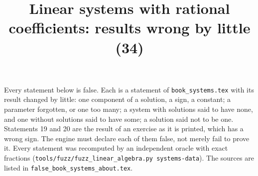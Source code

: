 \documentclass[11pt,a4paper]{article}
\title{Linear systems with rational coefficients: results wrong by little (34)}
\author{}
\date{}
\begin{document}
\maketitle
Every statement below is false. Each is a statement of \texttt{book\_systems.tex} with its result changed by little: one component of a solution, a sign, a constant; a parameter forgotten, or one too many; a system with solutions said to have none, and one without solutions said to have some; a solution said not to be one. Statements 19 and 20 are the result of an exercise as it is printed, which has a wrong sign. The engine must declare each of them false, not merely fail to prove it. Every statement was recomputed by an independent oracle with exact fractions (\texttt{tools/fuzz/fuzz\_linear\_algebra.py systems-data}). The sources are listed in \texttt{false\_book\_systems\_about.tex}.
\end{document}
